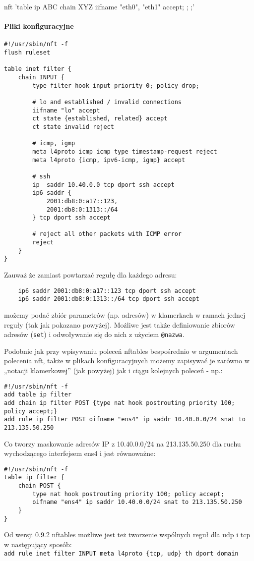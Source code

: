 \begin{CodeFrame*}[bash]{}
nft 'table ip ABC { chain XYZ { iifname {"eth0", "eth1"} accept; }; };'
\end{CodeFrame*}

\paragraph{Pliki konfiguracyjne}

\begin{Verbatim}
#!/usr/sbin/nft -f
flush ruleset

table inet filter {
	chain INPUT {
		type filter hook input priority 0; policy drop;
		
		# lo and established / invalid connections
		iifname "lo" accept
		ct state {established, related} accept
		ct state invalid reject
		
		# icmp, igmp
		meta l4proto icmp icmp type timestamp-request reject
		meta l4proto {icmp, ipv6-icmp, igmp} accept
		
		# ssh
		ip  saddr 10.40.0.0 tcp dport ssh accept
		ip6 saddr {
			2001:db8:0:a17::123,
			2001:db8:0:1313::/64
		} tcp dport ssh accept
		
		# reject all other packets with ICMP error
		reject
	}
}
\end{Verbatim}

\noindent Zauważ że zamiast powtarzać regułę dla każdego adresu:
\begin{Verbatim}
	ip6 saddr 2001:db8:0:a17::123 tcp dport ssh accept
	ip6 saddr 2001:db8:0:1313::/64 tcp dport ssh accept
\end{Verbatim}
możemy podać zbiór parametrów (np. adresów) w klamerkach w ramach jednej reguły (tak jak pokazano powyżej).
Możliwe jest także definiowanie zbiorów adresów (\Verb$set$) i odwoływanie się do nich z użyciem \Verb$@nazwa$.

Podobnie jak przy wpisywaniu poleceń nftables bespośrednio w argumentach polecenia nft, także w plikach konfiguracyjnych możemy zapisywać je zarówno w „notacji klamerkowej” (jak powyżej) jak i ciągu kolejnych poleceń - np.:

\begin{Verbatim}
#!/usr/sbin/nft -f
add table ip filter
add chain ip filter POST {type nat hook postrouting priority 100; policy accept;}
add rule ip filter POST oifname "ens4" ip saddr 10.40.0.0/24 snat to 213.135.50.250
\end{Verbatim}

\noindent Co tworzy maskowanie adresów IP z 10.40.0.0/24 na 213.135.50.250 dla ruchu wychodzącego interfejsem ens4 i jest równoważne:

\begin{Verbatim}
#!/usr/sbin/nft -f
table ip filter {
	chain POST {
		type nat hook postrouting priority 100; policy accept;
		oifname "ens4" ip saddr 10.40.0.0/24 snat to 213.135.50.250
	}
}
\end{Verbatim}

\vspace{5pt}\noindent
Od wersji 0.9.2 nftables możliwe jest też tworzenie wspólnych reguł dla udp i tcp w następujący sposób:
\\\Verb$add rule inet filter INPUT meta l4proto {tcp, udp} th dport domain$
